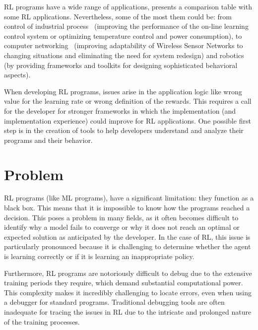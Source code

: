 \ac{RL} programs have a wide range of applications, \citet{8836506} presents a comparison table with some 
\ac{RL} applications. Nevertheless, some of the most them could be: from control of industrial process~\cite{8169685} (improving 
the performance of the on-line learning control system or optimizing temperature control and power consumption),
to computer networking~\cite{AlRawi2013ApplicationOR} (improving adaptability of Wireless Sensor Networks to changing situations and eliminating 
the need for system redesign) and robotics~\cite{zhang2015visionbaseddeepreinforcementlearning} (by providing frameworks and toolkits for designing sophisticated 
behavioral aspects). 

When developing \ac{RL} programs, issues arise in the application logic like wrong value for the
learning rate or wrong definition of the rewards. This requires a call for the developer for stronger frameworks in which 
the implementation (and implementation experience) could improve for \ac{RL} applications. One possible first step 
is in the creation of tools to help developers understand and analyze their programs and their behavior.

\section{Problem}

\ac{RL} programs (like \ac{ML} programs), 
have a significant limitation: they function as a black box. 
This means that it is impossible to know how the programs reached a decision. This poses 
a problem in many fields, as it often becomes difficult to identify why a model 
fails to converge or why it does not reach an optimal or expected solution as 
anticipated by the developer. In the case of \ac{RL}, this issue is particularly 
pronounced because it is challenging to determine whether the agent is learning 
correctly or if it is learning an inappropriate policy.

Furthermore, \ac{RL} programs are notoriously difficult to debug due to the extensive 
training periods they require, which demand substantial computational power. This 
complexity makes it incredibly challenging to locate errors, even when using a 
debugger for standard programs. Traditional debugging tools are often inadequate 
for tracing the issues in \ac{RL} due to the intricate and prolonged nature of the 
training processes. 

